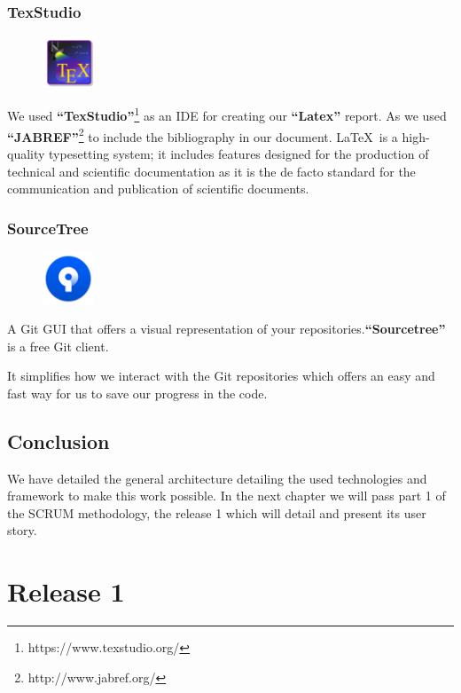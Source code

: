 \documentclass[12pt,a4paper]{report}
\begin{document}
	\subsection{TexStudio}
	\begin{figure}
		\centering
		\includegraphics[width=0.6in]{texstudio.png}
	\end{figure}
	We used \textbf{``TexStudio''}\footnote{https://www.texstudio.org/} as an IDE for creating our \textbf{``Latex''} report. As we used \textbf{``JABREF''}\footnote{http://www.jabref.org/} to include the bibliography in our document. \LaTeX~is a high-quality typesetting system; it includes features designed for the production of technical and scientific documentation as it is the de facto standard for the communication and publication of scientific documents.
	
	\subsection{SourceTree}
	\begin{figure}
		\centering
		\includegraphics[width=0.6in]{sourcetreelogo.png}
	\end{figure}
	A Git GUI that offers a visual representation of your repositories.\textbf{``Sourcetree''}  is a free Git client.\par 
	It simplifies how we interact with the Git repositories which offers an easy and fast way for us to save our progress in the code.
	\section*{Conclusion}
	We have detailed the general architecture detailing the used technologies and framework to make this work possible.
	In the next chapter we will pass part 1 of the SCRUM methodology, the release 1 which will detail and present its user story.
	\chapter{Release 1}
\end{document}

